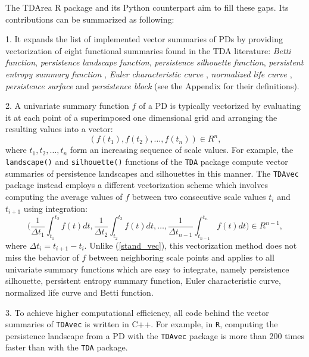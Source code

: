 \documentclass{article}
\begin{document}
The TDArea R package and its Python counterpart aim to fill these gaps. Its contributions can be summarized as following:

1. It expands the list of implemented vector summaries of PDs by providing vectorization of eight functional summaries found in the TDA literature: \emph{Betti function}, \emph{persistence landscape function}, \emph{persistence silhouette function}, \emph{persistent entropy summary function} \cite{atienza2020stability}, \emph{Euler characteristic curve} \cite{richardson2014efficient}, \emph{normalized life curve} \cite{chung2022persistence}, \emph{persistence surface} \cite{adams2017persistence} and \emph{persistence block} \cite{chan2022computationally} (see the Appendix for their definitions).

2. A univariate summary function $f$ of a PD is typically vectorized by evaluating it at each point of a superimposed one dimensional grid and arranging the resulting values into a vector:
\begin{equation}\label{stand_vec}
		(f(t_1),f(t_2),\ldots,f(t_n))\in {R}^n,
\end{equation}
where $t_1,t_2,\ldots,t_n$ form an increasing sequence of scale values. For example, the \texttt{landscape()} and \texttt{silhouette()} functions of the \texttt{TDA} package compute vector summaries of persistence landscapes and silhouettes in this manner. The \texttt{TDAvec} package instead employs a different vectorization scheme which involves computing the average values of $f$ between two consecutive scale values $t_i$ and $t_{i+1}$ using integration: 
\begin{equation} 
	\Big(\frac{1}{\Delta t_1}\int_{t_1}^{t_2}f(t)dt,\frac{1}{\Delta t_2}\int_{t_2}^{t_3}f(t)dt,\ldots,\frac{1}{\Delta t_{n-1}}\int_{t_{n-1}}^{t_n}f(t)dt\Big)\in{R}^{n-1}, 
\end{equation}
where $\Delta t_i=t_{i+1}-t_i$. Unlike (\ref{stand_vec}), this vectorization method does not miss the behavior of $f$ between neighboring scale points and applies to all univariate summary functions which are easy to integrate, namely persistence silhouette, persistent entropy summary function, Euler characteristic curve, normalized life curve and Betti function. 

3. To achieve higher computational efficiency, all code behind the vector summaries of \texttt{TDAvec} is written in C++. For example, in \texttt{R}, computing the persistence landscape from a PD with the \texttt{TDAvec} package is more than 200 times faster than with the \texttt{TDA} package.
\end{document}
